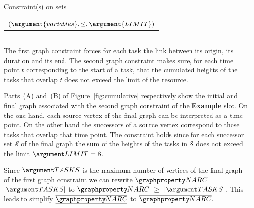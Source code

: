 \begin{ctrdesc}
{\begin{minipage}[t]{11.2cm}
\begin{tabular}[t]{l}
\begin{array}[t]{l}
\begin{array}{l}
\begin{array}{l}
- $\hyperlink{DT_collection}{$\argument{collection}$}$ (- $\hyperlink{DT_dvar}{$\argument{dvar}$}$ ),
\\\lb{}(-.)\rb\\
\end{array}\right) \\
\end{array}\right] \\
\end{array} $\\
\end{tabular}
\item[Constraint(s) on sets]
\begin{tabular}[t]{l}
$ $\hyperlink{Csum_ctr}{\ctrref{sum\_ctr}}$(,\leq ,)$\\
\end{tabular}
\hrule

\end{minipage}}
\item[\pdfmarkup{subject={Graph model},color=white,markup=Highlight}{Graph model}{Explicit description in terms of graph property of the meaning of the constraint.}]
The first graph constraint forces for each task the link between
its origin, its duration and its end.
The second graph constraint makes sure, for each time point $t$
corresponding to the start of a task, that the cumulated heights of
the tasks that overlap $t$ does not exceed the limit of the resource.

Parts~(A) and~(B) of Figure~\ref{fig:cumulative} respectively show
the initial and final graph associated with the second graph constraint
of the {\bf Example} slot.
On the one hand, each source vertex of the final graph can be interpreted
as a time point. On the other hand the successors of a source vertex
correspond to those tasks that overlap that time point.
The  constraint holds since for each successor
set $\mathcal{S}$ of the final graph the sum of the heights of the tasks
in $\mathcal{S}$ does not exceed the limit $\MLIMIT=8$.

\examplefigv

\item[\pdfmarkup{subject={Signature},color=white,markup=Highlight}{Signature}{Provides some explanations about the graph based signature of the constraint.}]
Since $\MTASKS$ is the maximum number of vertices of the final graph
of the first graph constraint we can rewrite
\hyperlink{GC_NARC}{$\MNARC$} $=$ $|\MTASKS|$ to
\hyperlink{GC_NARC}{$\MNARC$} $\geq$ $|\MTASKS|$.
This leads to simplify
\hyperlink{GC_NARC}{$\underline{\overline{\MNARC}}$} to
\hyperlink{GC_NARC}{$\overline{\MNARC}$}.


\end{ctrdesc}

